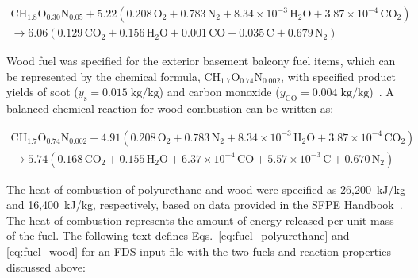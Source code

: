 \documentclass[12pt,oneside]{book}
\renewcommand{\C}{\mbox{C}}
\renewcommand{\H}{\mbox{H}}
\renewcommand{\O}{\mbox{O}}
\newcommand{\N}{\mbox{N}}
\begin{document}
\begin{multline}
\C\H_{1.8}\O_{0.30}\N_{0.05} + 5.22(0.208\,\O_{2} + 0.783\,\N_{2} + 8.34 \times 10^{-3}\,\H_{2}\O + 3.87 \times 10^{-4}\,\C\O_{2}) \\
\rightarrow 6.06(0.129\,\C\O_{2} + 0.156\,\H_{2}\O + 0.001\,\C\O + 0.035\,\C + 0.679\,\N_{2})
\label{eq:fuel_polyurethane}
\end{multline}


\clearpage


Wood fuel was specified for the exterior basement balcony fuel items, which can be represented by the chemical formula, $\C\H_{1.7}\O_{0.74}\N_{0.002}$, with specified product yields of soot ($y_{\mathrm{s}}=0.015 \; \mathrm{kg}/\mathrm{kg}$) and carbon monoxide ($y_{\mathrm{CO}}=0.004 \; \mathrm{kg}/\mathrm{kg}$)~\cite{SFPE:Tewarson}. A balanced chemical reaction for wood combustion can be written as:

\begin{multline}
\C\H_{1.7}\O_{0.74}\N_{0.002} + 4.91(0.208\,\O_{2} + 0.783\,\N_{2} + 8.34 \times 10^{-3}\,\H_{2}\O + 3.87 \times 10^{-4}\,\C\O_{2}) \\
\rightarrow 5.74(0.168\,\C\O_{2} + 0.155\,\H_{2}\O + 6.37 \times 10^{-4}\,\C\O + 5.57 \times 10^{-3}\,\C + 0.670\,\N_{2})
\label{eq:fuel_wood}
\end{multline}

The heat of combustion of polyurethane and wood were specified as 26,200~kJ/kg and 16,400~kJ/kg, respectively, based on data provided in the SFPE Handbook~\cite{SFPE:Tewarson}. The heat of combustion represents the amount of energy released per unit mass of the fuel. The following text defines Eqs.~\ref{eq:fuel_polyurethane} and \ref{eq:fuel_wood} for an FDS input file with the two fuels and reaction properties discussed above:
\end{document}
